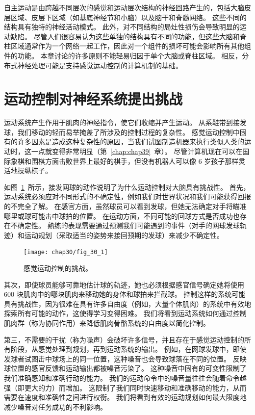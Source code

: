 自主运动是由跨越不同层次的感觉和运动层次结构的神经回路产生的，包括大脑皮层区域、皮层下区域（如基底神经节和小脑）以及脑干和脊髓网络。
这些不同的结构具有独特的神经活动模式。
此外，对不同结构的局灶性损伤会导致明显的运动缺陷。 
尽管人们很容易认为这些单独的结构具有不同的功能，但这些大脑和脊柱区域通常作为一个网络一起工作，因此对一个组件的损坏可能会影响所有其他组件的功能。
本章讨论的许多原则不能轻易归因于单个大脑或脊柱区域。
相反，分布式神经处理可能是支持感觉运动控制的计算机制的基础。



\section{运动控制对神经系统提出挑战}

运动系统产生作用于肌肉的神经指令，使它们收缩并产生运动。
从系鞋带到接发球，我们移动的轻而易举掩盖了所涉及的控制过程的复杂性。
感觉运动控制中固有的许多因素是造成这种复杂性的原因，当我们试图制造机器来执行类似人类的运动时，这一点就变得非常明显（第~\ref{chap:chap39}~章）。 
尽管计算机现在可以在国际象棋和围棋方面击败世界上最好的棋手，但没有机器人可以像 6 岁孩子那样灵活地操纵棋子。


如图~\ref{fig:30_1}~所示，接发网球的动作说明了为什么运动控制对大脑具有挑战性。
首先，运动系统必须应对不同形式的不确定性，例如我们对世界状况和我们可能获得回报的不完全了解。
在感官方面，虽然球员可以看到发球，但她无法确定对手将瞄准哪里或球可能击中球拍的位置。
在运动方面，不同可能的回球方式是否成功也存在不确定性。
熟练的表现需要通过预测我们可能遇到的事件（对手的网球发球轨迹）和运动规划（采取适当的姿势来接回预期的发球）来减少不确定性。


\begin{figure}[htbp]
	\centering
	\texttt{[image: chap30/fig\_30\_1]}
	\caption{感觉运动控制的挑战。}
	\label{fig:30_1}
\end{figure}


其次，即使球员能够可靠地估计球的轨迹，她也必须根据感官信号确定她将使用 600 块肌肉中的哪块肌肉来移动她的身体和球拍来拦截球。
控制这样的系统可能具有挑战性，因为很难在具有许多自由度（例如，大量个体肌肉）的系统中有效地探索所有可能的动作，这使得学习变得困难。
我们将看到运动系统如何通过控制肌肉群（称为协同作用）来降低肌肉骨骼系统的自由度以简化控制。


第三，不需要的干扰（称为噪声）会破坏许多信号，并且存在于感觉运动控制的所有阶段，从感觉处理到规划，再到运动系统的输出。
例如，在网球发球中，即使发球者试图击中球场上的同一位置，这种噪音也会导致球落在不同的位置。
反映球位置的感官反馈和运动输出都被噪音污染了。
这种噪音中固有的可变性限制了我们准确感知和准确行动的能力。
我们的运动命令中的噪音量往往会随着命令越强（即更大的力）而增加。
这限制了我们同时快速移动和准确移动的能力，从而需要在速度和准确性之间进行权衡。
我们将看到有效的运动规划如何最大限度地减少噪音对任务成功的不利影响。


